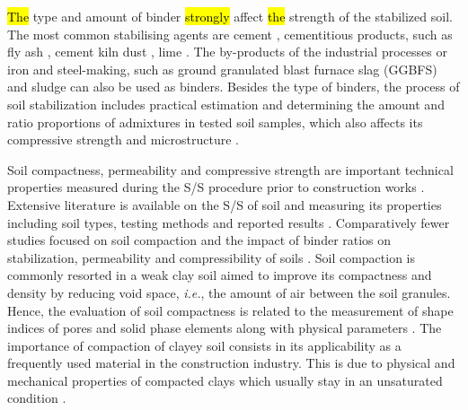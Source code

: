 \documentclass{amestyle}
\begin{document}
\hl{The} type and amount of binder \hl{strongly} affect \hl{the} strength of the stabilized soil. The most common stabilising agents are cement \cite{Rekik}, cementitious products, such as fly ash \cite{Tastan,Hasan}, cement kiln dust \cite{Solanki,Lindh2021a}, lime \cite{ARULRAJAH2017999,BIAN20211124,ANDAVAN20201125,INDIRAMMA2020694}. The by-products of the industrial processes or iron and steel-making, such as ground granulated blast furnace slag (GGBFS) \cite{Mozejko} and sludge \cite{Ingunza,Sharif} can also be used as binders. Besides the type of binders, the process of soil stabilization includes practical estimation and determining the amount and ratio proportions of admixtures in tested soil samples, which also affects its compressive strength and microstructure \cite{Lindh2001,Ahmed}.

Soil compactness, permeability and compressive strength are important technical properties measured during the S/S procedure prior to construction works \cite{LindhWinter,XU2021114774}. Extensive literature is available on the S/S of soil and measuring its properties including soil types, testing methods and reported results \cite{Anagnostopoulos,Kallenetal2016,Lemenkov2021a,HUANG2022115452}. Comparatively fewer studies focused on soil compaction and the impact of binder ratios on stabilization, permeability and compressibility of soils \cite{Kongkitkul,Leeetal2007}. Soil compaction is commonly resorted in a weak clay soil aimed to improve its compactness and density by reducing void space, \emph{i.e.}, the amount of air between the soil granules. Hence, the evaluation of soil compactness is related to the measurement of shape indices of pores and solid phase elements along with physical parameters \cite{Bryk}. The importance of compaction of clayey soil consists in its applicability as a frequently used material in the construction industry. This is due to physical and mechanical properties of compacted clays which usually stay in an unsaturated condition \cite{Zou}. 
\end{document}

